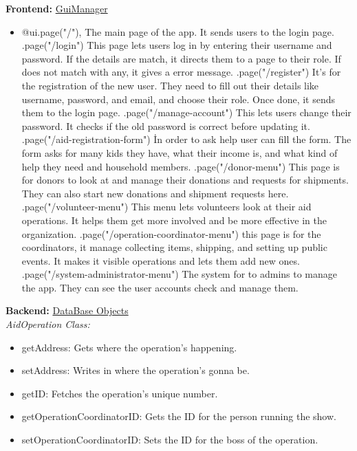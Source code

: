 \documentclass[a4paper,12pt]{report}
\begin{document}
			\textbf{Frontend:}
			\underline{GuiManager}
				\begin{itemize}
				\item @ui.page("/"),
				 The main page of the app. It  sends users  to the login page.
				 	\item@ui.page("/login")
				 	This page lets users log in by entering their username and password. If the details are match, it directs them to a page to their role. If does not match with any, it gives a error message.
				 	\item@ui.page("/register")
				 	It's for the registration of the new user. They need to fill out their details like username, password, and email, and choose their role. Once done, it sends them to the login page.
				 	\item@ui.page("/manage-account")
				 	This lets users change their password. It checks if the old password is correct before updating it.
				 		\item@ui.page("/aid-registration-form")
				 	İn order to ask help user can fill the form. The form asks for  many kids they have, what their income is, and what kind of help they need and household members.
				 	\item@ui.page("/donor-menu")
				 	This page is for donors to look at and manage their donations and requests for shipments. They can also start new donations and shipment requests here.
				 		\item@ui.page("/volunteer-menu")
				 		This menu lets volunteers look at their aid operations. It helps them get more involved and be more effective in the organization.
				 		\item@ui.page("/operation-coordinator-menu")
				 		 this page is for the coordinators, it manage  collecting items, shipping, and setting up public events. It makes it visible operations and lets them add new ones.
				 		\item@ui.page("/system-administrator-menu")
				 		 The system for to admins to manage the app. They can see the user accounts check and  manage them. 
				 	
				 	
				 	
				 
			\end{itemize}
				\textbf{Backend:}
			\underline{DataBase Objects} \\
			
			\textit{AidOperation Class:} 
			\begin{itemize}
			
				\item getAddress: Gets where the operation's happening.
				\item setAddress: Writes in where the operation's gonna be.
				\item getID: Fetches the operation’s unique number.
				\item getOperationCoordinatorID: Gets the ID for the person running the show.
				\item setOperationCoordinatorID: Sets the ID for the boss of the operation.
				
				
				
				
			\end{itemize}
			
\end{document}

